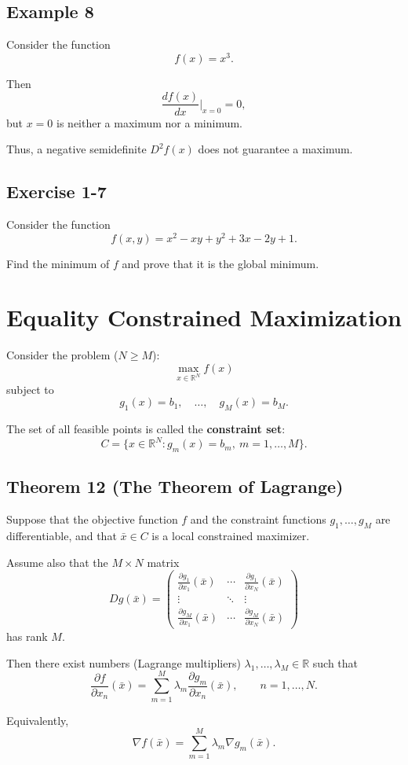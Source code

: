 \subsection*{Example 8}

Consider the function
\[
f(x) = x^3.
\]

Then
\[
\frac{df(x)}{dx}\bigg|_{x=0} = 0,
\]
but $x=0$ is neither a maximum nor a minimum.

Thus, a negative semidefinite $D^2 f(x)$ does not guarantee a maximum.

\begin{tcolorbox}[breakable]

\subsection*{Exercise 1-7}

Consider the function
\[
f(x,y) = x^2 - xy + y^2 + 3x - 2y + 1.
\]

Find the minimum of $f$ and prove that it is the global minimum.

\end{tcolorbox}


\section{Equality Constrained Maximization}

Consider the problem ($N \ge M$):
\[
\max_{x \in \mathbb{R}^N} f(x)
\]
subject to
\[
g_1(x) = b_1,\quad \dots,\quad g_M(x) = b_M.
\]

The set of all feasible points is called the \textbf{constraint set}:
\[
C = \{x \in \mathbb{R}^N : g_m(x) = b_m,\ m=1,\dots,M\}.
\]

\begin{tcolorbox}[breakable, colback=white]
\subsection*{Theorem 12 (The Theorem of Lagrange)}

Suppose that the objective function $f$ and the constraint functions
$g_1, \dots, g_M$ are differentiable, and that $\bar x \in C$ is a local
constrained maximizer.

Assume also that the $M \times N$ matrix
\[
Dg(\bar x) =
\begin{pmatrix}
\frac{\partial g_1}{\partial x_1}(\bar x) & \cdots & \frac{\partial g_1}{\partial x_N}(\bar x) \\
\vdots & \ddots & \vdots \\
\frac{\partial g_M}{\partial x_1}(\bar x) & \cdots & \frac{\partial g_M}{\partial x_N}(\bar x)
\end{pmatrix}
\]
has rank $M$.

Then there exist numbers (Lagrange multipliers)
$\lambda_1, \dots, \lambda_M \in \mathbb{R}$ such that
\[
\frac{\partial f}{\partial x_n}(\bar x)
=
\sum_{m=1}^M \lambda_m \frac{\partial g_m}{\partial x_n}(\bar x),
\qquad n = 1, \dots, N.
\]

Equivalently,
\[
\nabla f(\bar x) = \sum_{m=1}^M \lambda_m \nabla g_m(\bar x).
\]
\end{tcolorbox}


